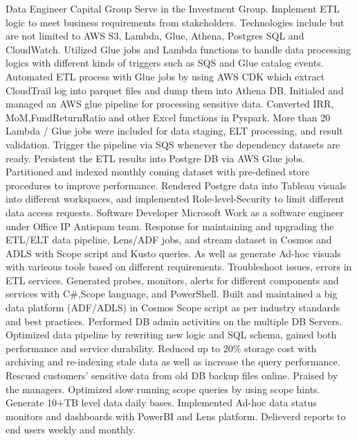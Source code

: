 \documentclass[a4paper]{ReadableCV}
\begin{document}
{}
{Data Engineer}
{Capital Group}
{Serve in the Investment Group. Implement ETL logic to meet business requirements from stakeholders. Technologies include but are not limited to AWS S3, Lambda, Glue, Athena, Postgres SQL and CloudWatch.}
{Utilized Glue jobs and Lambda functions to handle data processing logics with different kinds of triggers such as SQS and Glue catalog events.}
{Automated ETL process with Glue jobs by using AWS CDK which extract CloudTrail log into parquet files and dump them into Athena DB.}
{Initialed and managed an AWS glue pipeline for processing sensitive data. Converted IRR, MoM,FundReturnRatio and other Excel functions in Pyspark. More than 20 Lambda / Glue jobs were included for data staging, ELT processing, and result validation. Trigger the pipeline via SQS whenever the dependency datasets are ready.}
{Persistent the ETL results into Postgre DB via AWS Glue jobs. Partitioned and indexed monthly coming dataset with pre-defined store procedures to improve performance.}
{Rendered Postgre data into Tableau visuals into different workspaces, and implemented Role-level-Security to limit different data access requests.}
{Software Developer}
{Microsoft}
{Work as a software engineer under Office IP Antispam team. Response for maintaining and upgrading the ETL/ELT data pipeline, Lens/ADF jobs, and stream dataset in
	Cosmos and ADLS with Scope script and Kusto queries. As well as generate Ad-hoc visuals with varieous tools based on different requirements. }
{Troubleshoot issues, errors in ETL services. Generated probes, monitors, alerts for different components and services with C\#,Scope language, and PowerShell.}
{Built and maintained a big data platform (ADF/ADLS) in Cosmos Scope script as per industry standards and best practices.}
{Performed DB admin activities on the multiple DB Servers. Optimized data pipeline by rewriting new logic and SQL schema, gained both performance and service
	durability. Reduced up to 20\% storage cost with archiving and re-indexing stale data as well as increase the query performance.}
{Rescued customers' sensitive data from old DB backup files online. Praised by the managers.}
{Optimized slow running scope queries by using scope hints. Generate 10+TB level data daily bases.}
{Implemented Ad-hoc data status monitors and dashboards with PowerBI and Lens platform. Delieverd reports to end users weekly and monthly.}
\end{document}
